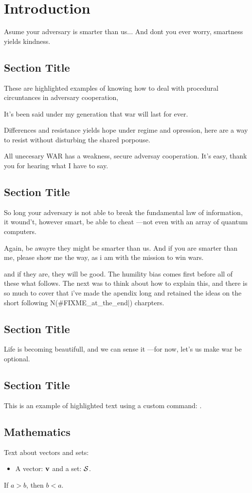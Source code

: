 \chapter{Introduction}
Asume your adversary is smarter than us... And dont you ever worry, smartness yields kindness. 

\section{Section Title}
These are highlighted examples of knowing how to deal with procedural circuntances in adversary cooperation, 

It's been said under my generation that war will last for ever. 

Differences and resistance yields hope under regime and opression, 
here are a way to resist without disturbing the shared porpouse. 

All unecesary WAR has a weakness, secure adversay cooperation. It's easy, thank you for hearing what I have to say. 


\section{Section Title}
So long your adversary is not able to break the fundamental law of information, 
it wound't, however smart, be able to cheat ---not even with an array of quantum computers. 

Again, be awayre they might be smarter than us. And if you are smarter than me, 
please show me the way, as i am with the mission to win wars. 

and if they are, they will be good. The humility bias comes first before all of these what follows. 
The next was to think about how to explain this, and there is so much to cover that i've made the 
apendix long and retained the ideas on the short following N(#FIXME_at_the_end|) charpters. 

\section{Section Title}
Life is becoming beautifull, and we can sense it ---for now, let's us make war be optional. 

\section{Section Title}
This is an example of highlighted text using a custom command: .

\section{Mathematics}
Text about vectors and sets:
\begin{itemize}
    \item A vector: $\mathbf{v}$ and a set: $\mathcal{S}$.
\end{itemize}

\begin{theorem}
If \( a > b \), then \( b < a \).
\end{theorem}
